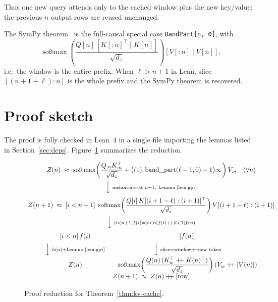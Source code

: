 \documentclass[11pt,a4paper]{article}
\newcommand{\bandpart}{\operatorname{band\_part}}
\newcommand{\rowop}{\operatorname{row}}
\newcommand{\concat}{\mathbin{+\mkern-4mu+}}
\newcommand{\XEq}{\approx}
\begin{document}
Thus one new query attends only to the cached window plus the new key/value; the previous $n$ output rows are reused unchanged.

The SymPy theorem~\cite{lemma_kv_cache_sympy} is the full-causal special case \texttt{BandPart[n, 0]}, with
\[
\operatorname{softmax}\!\left(\frac{Q[n]\,[K[:n]^{\top}\mid K[n]]}{\sqrt{d_z}}\right)[V[:n]\mid V[n]],
\]
i.e.\ the window is the entire prefix.
When $\ell>n+1$ in Lean, slice $[(n+1-\ell):n]$ is the whole prefix and the SymPy theorem is recovered.

\section{Proof sketch}
\label{sec:proof}

The proof is fully checked in Lean~4 in a single file importing the lemmas listed in Section~\ref{sec:deps}.
Figure~\ref{fig:reduction} summarizes the reduction.

\begin{figure}[ht]
\centering
\[
\begin{array}{c}
Z(n)\;\XEq\;
\operatorname{softmax}\!\left(
\dfrac{Q_{:n}K_{:n}^{\top}}{\sqrt{d_{z}}}
+\bigl((1).\bandpart(\ell-1,0)-1\bigr)\infty
\right)V_{:n}
\quad(\forall n)
\\[1.1em]
\Big\downarrow\ \scriptstyle\text{instantiate at }n+1,\ \text{Lemma~\ref{lem:gpt}}
\\[0.9em]
Z(n+1)\;\XEq\;
[i<n+1]\;
\operatorname{softmax}\!\left(
\dfrac{Q[i]\,K[(i+1-\ell):(i+1)]^{\top}}{\sqrt{d_{z}}}
\right)
V[(i+1-\ell):(i+1)]
\\[1.1em]
\Big\downarrow\ \scriptstyle [i<n+1]f(i)=[i<n]f(i)\concat[i<1]f(n)
\\[0.9em]
\begin{array}{c@{\qquad}c}
[i<n]\,f(i) & [f(n)] \\[0.5em]
\Big\downarrow\ \scriptstyle h(n)+\text{Lemma~\ref{lem:gpt}} & \Big\downarrow\ \scriptstyle\text{slice}=\text{window}\concat\text{new token} \\[0.5em]
Z(n) &
\operatorname{softmax}\!\left(\dfrac{Q(n)\,(K_{w}^{\top}\concat K(n)^{\top})}{\sqrt{d_{z}}}\right)(V_{w}\concat[V(n)])
\end{array}
\\[1.6em]
Z(n+1)\;\XEq\; Z(n)\concat[\rowop]
\end{array}
\]
\caption{Proof reduction for Theorem~\ref{thm:kv-cache}.}
\label{fig:reduction}
\end{figure}
\end{document}
